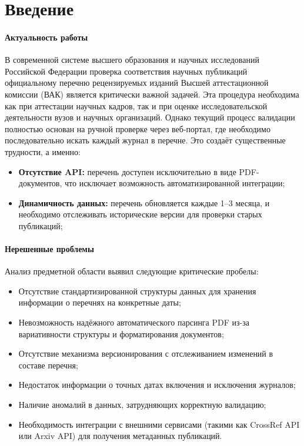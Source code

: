 \chapter*{Введение}
\label{sec:afterwords}

\subsubsection*{Актуальность работы}
В современной системе высшего образования и научных исследований Российской Федерации
проверка соответствия научных публикаций официальному перечню рецензируемых 
изданий Высшей аттестационной комиссии (ВАК) \cite{VAK} является критически важной
задачей. Эта процедура необходима как при аттестации научных кадров, так и при оценке
исследовательской деятельности вузов и научных организаций.
Однако текущий процесс валидации полностью основан на ручной проверке через веб-портал, 
где необходимо последовательно искать каждый журнал в перечне. Это создаёт существенные трудности, а именно:

\begin{itemize}
	\item \textbf{Отсутствие API:} перечень доступен исключительно в виде
	PDF-документов, что исключает возможность автоматизированной интеграции;
    \item \textbf{Динамичность данных:} перечень обновляется каждые 1–3 месяца, 
	и необходимо отслеживать исторические версии для проверки старых публикаций;
\end{itemize}

\subsubsection*{Нерешенные проблемы}

Анализ предметной области выявил следующие критические пробелы:

\begin{itemize}
	\item Отсутствие стандартизированной структуры данных для хранения информации о перечнях на конкретные даты;
	\item Невозможность надёжного автоматического парсинга PDF из-за вариативности структуры и форматирования документов;
	\item Отсутствие механизма версионирования с отслеживанием изменений в составе перечня;
	\item Недостаток информации о точных датах включения и исключения журналов;
	\item Наличие аномалий в данных, затрудняющих корректную валидацию;
	\item Необходимость интеграции с внешними сервисами (такими как CrossRef API или Arxiv API) для получения метаданных публикаций.
\end{itemize}

